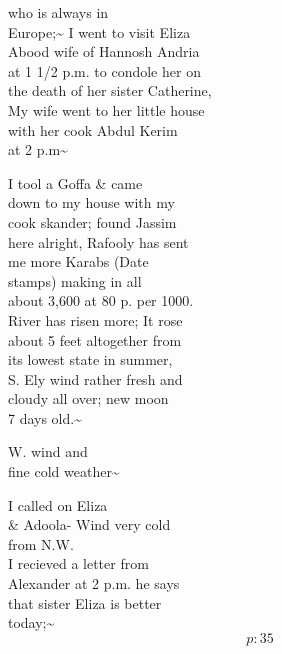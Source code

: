 \documentclass{report}
\begin{document}

	\par{
 	who is always in\ \\Europe;\~{} I went to visit Eliza\ \\Abood wife of Hannosh Andria\ \\at 1 1/2 p.m. to condole her on\ \\the death of her sister Catherine,\ \\My wife went to her little house\ \\with her cook Abdul Kerim\ \\at 2 p.m\~{}\ \\
	}

	\par{
 	I tool a Goffa \& came\ \\down to my house with my\ \\cook skander; found Jassim\ \\here alright, Rafooly has sent\ \\me more Karabs (Date\ \\stamps) making in all\ \\about 3,600 at 80 p. per 1000.\ \\River has risen more; It rose\ \\about 5 feet altogether from\ \\its lowest state in summer,\ \\S. Ely wind rather fresh and\ \\cloudy all over; new moon\ \\7 days old.\~{}\ \\
	}


	\par{
 	W. wind and\ \\fine cold weather\~{}\ \\
	}

	\par{
 	I called on Eliza\ \\\& Adoola- Wind very cold\ \\from N.W.\ \\I recieved a letter from\ \\Alexander at 2 p.m. he says\ \\that sister Eliza is better\ \\today;\~{}\ \\
  \[p: 35 \]

	}

\end{document}
